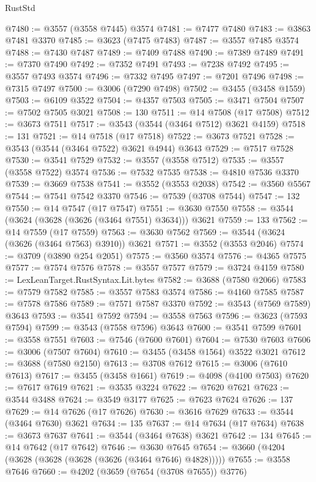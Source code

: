 \begin{lexlean}{RustStd}
\begin{coremodule}
@7480 := @3557 (@3558 @7445) @3574
@7481 := @7477 @7480
@7483 := @3863 @7481 @3370
@7485 := @3623 (@7475 @7483)
@7487 := @3557 @7485 @3574
@7488 := @7430 @7487
@7489 := @7409 @7488
@7490 := @7389 @7489
@7491 := @7370 @7490
@7492 := @7352 @7491
@7493 := @7238 @7492
@7495 := @3557 @7493 @3574
@7496 := @7332 @7495
@7497 := @7201 @7496
@7498 := @7315 @7497
@7500 := @3006 (@7290 @7498)
@7502 := @3455 (@3458 @1559)
@7503 := @6109 @3522
@7504 := @4357 @7503
@7505 := @3471 @7504
@7507 := @7502 @7505 @3021
@7508 := 130
@7511 := @14 @7508 (@17 @7508)
@7512 := @3673 @7511
@7517 := @3543 (@3544 (@3464 @7512) @3621 @4159)
@7518 := 131
@7521 := @14 @7518 (@17 @7518)
@7522 := @3673 @7521
@7528 := @3543 (@3544 (@3464 @7522) @3621 @4944) @3643
@7529 := @7517 @7528
@7530 := @3541 @7529
@7532 := @3557 (@3558 @7512)
@7535 := @3557 (@3558 @7522) @3574
@7536 := @7532 @7535
@7538 := @4810 @7536 @3370
@7539 := @3669 @7538
@7541 := @3552 (@3553 @2038)
@7542 := @3560 @5567
@7544 := @7541 @7542 @3370
@7546 := @7539 (@3708 @7544)
@7547 := 132
@7550 := @14 @7547 (@17 @7547)
@7551 := @3630 @7550
@7558 := @3544 (@3624 (@3628 (@3626 (@3464 @7551) @3634))) @3621
@7559 := 133
@7562 := @14 @7559 (@17 @7559)
@7563 := @3630 @7562
@7569 := @3544 (@3624 (@3626 (@3464 @7563) @3910)) @3621
@7571 := @3552 (@3553 @2046)
@7574 := @3709 (@3890 @254 @2051)
@7575 := @3560 @3574
@7576 := @4365 @7575
@7577 := @7574 @7576
@7578 := @3557 @7577
@7579 := @3724 @4159
@7580 := LexLeanTarget.RustSyntax.Lit.bytes
@7582 := @3688 (@7580 @2066)
@7583 := @7579 @7582
@7585 := @3557 @7583 @3574
@7586 := @4160 @7585
@7587 := @7578 @7586
@7589 := @7571 @7587 @3370
@7592 := @3543 (@7569 @7589) @3643
@7593 := @3541 @7592
@7594 := @3558 @7563
@7596 := @3623 (@7593 @7594)
@7599 := @3543 (@7558 @7596) @3643
@7600 := @3541 @7599
@7601 := @3558 @7551
@7603 := @7546 (@7600 @7601)
@7604 := @7530 @7603
@7606 := @3006 (@7507 @7604)
@7610 := @3455 (@3458 @1564) @3522 @3021
@7612 := @3688 (@7580 @2150)
@7613 := @3708 @7612
@7615 := @3006 (@7610 @7613)
@7617 := @3455 (@3458 @1661)
@7619 := @4098 (@4100 @7503)
@7620 := @7617 @7619
@7621 := @3535 @3224
@7622 := @7620 @7621
@7623 := @3544 @3488
@7624 := @3549 @3177
@7625 := @7623 @7624
@7626 := 137
@7629 := @14 @7626 (@17 @7626)
@7630 := @3616 @7629
@7633 := @3544 (@3464 @7630) @3621
@7634 := 135
@7637 := @14 @7634 (@17 @7634)
@7638 := @3673 @7637
@7641 := @3544 (@3464 @7638) @3621
@7642 := 134
@7645 := @14 @7642 (@17 @7642)
@7646 := @3630 @7645
@7654 := @3660 (@4204 (@3628 (@3628 (@3628 (@3626 (@3464 @7646) @4828)))))
@7655 := @3558 @7646
@7660 := @4202 (@3659 (@7654 (@3708 @7655)) @3776)

\end{coremodule}
\end{lexlean}
